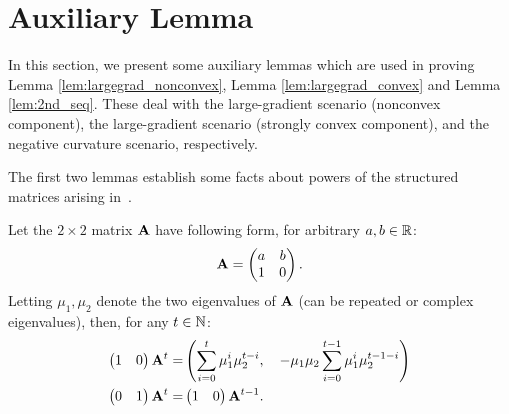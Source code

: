 
\section{Auxiliary Lemma}
In this section, we present some auxiliary lemmas which are used 
in proving Lemma \ref{lem:largegrad_nonconvex}, Lemma \ref{lem:largegrad_convex} and Lemma \ref{lem:2nd_seq}.  These deal with the large-gradient scenario (nonconvex component), the large-gradient scenario (strongly convex component), and the negative curvature scenario, respectively.

The first two lemmas establish some facts about powers of the structured 
matrices arising in~\nag.
\begin{lemma}\label{lem:aux_matrix_form}
Let the $2\times 2$ matrix $\mathbf{A}$ have following form, for arbitrary $a, b\in \mathbb{R}$:
\begin{equation*}
\mathbf{A} = \begin{pmatrix}  a &  b \\1 & 0 \end{pmatrix}.
\end{equation*}
Letting $\mu_1, \mu_2$ denote the two eigenvalues of $\mathbf{A}$ (can be repeated or complex eigenvalues), then, for any $t\in \mathbb{N}$:
\begin{align*}
\begin{pmatrix} 1 & 0  \end{pmatrix} \mathbf{A}^t =&
\left(\sum_{i=0}^t \mu_1^i \mu_2^{t-i}, \quad - \mu_1\mu_2\sum_{i=0}^{t-1} \mu_1^{i} \mu_2^{t-1-i}\right)\\
\begin{pmatrix} 0 & 1  \end{pmatrix} \mathbf{A}^t =& \begin{pmatrix} 1 & 0  \end{pmatrix} \mathbf{A}^{t-1}.
\end{align*}
\end{lemma}
